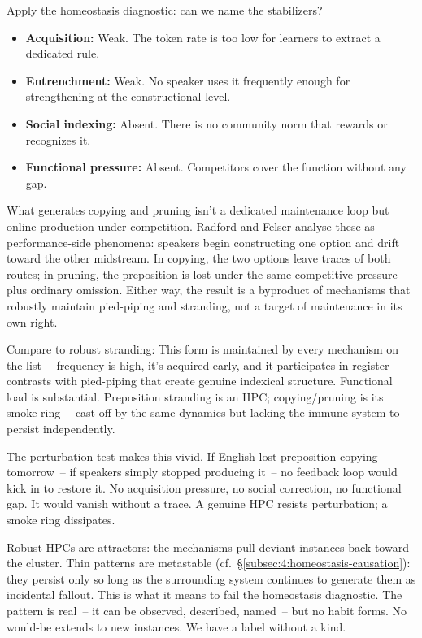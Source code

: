 Apply the homeostasis diagnostic: can we name the stabilizers?

\begin{itemize}
    \item \textbf{Acquisition:} Weak. The token rate is too low for learners to extract a dedicated rule.
    \item \textbf{Entrenchment:} Weak. No speaker uses it frequently enough for strengthening at the constructional level.
    \item \textbf{Social indexing:} Absent. There is no community norm that rewards or recognizes it.
    \item \textbf{Functional pressure:} Absent. Competitors cover the function without any gap.
\end{itemize}

What generates copying and pruning isn't a dedicated maintenance loop but online production under competition. Radford and Felser analyse these as performance-side phenomena: speakers begin constructing one option and drift toward the other midstream. In copying, the two options leave traces of both routes; in pruning, the preposition is lost under the same competitive pressure plus ordinary omission. Either way, the result is a byproduct of mechanisms that robustly maintain pied-piping and stranding, not a target of maintenance in its own right.

Compare to robust stranding:  This form is maintained by every mechanism on the list~-- frequency is high, it's acquired early, and it participates in register contrasts with pied-piping that create genuine indexical structure. Functional load is substantial. Preposition stranding is an HPC; copying/pruning is its smoke ring~-- cast off by the same dynamics but lacking the immune system to persist independently.

The perturbation test makes this vivid. If English lost preposition copying tomorrow~-- if speakers simply stopped producing it~-- no feedback loop would kick in to restore it. No acquisition pressure, no social correction, no functional gap. It would vanish without a trace. A genuine HPC resists perturbation; a smoke ring dissipates.

Robust HPCs are attractors: the mechanisms pull deviant instances back toward the cluster. Thin patterns are metastable (cf.\ §\ref{subsec:4:homeostasis-causation}): they persist only so long as the surrounding system continues to generate them as incidental fallout. This is what it means to fail the homeostasis diagnostic. The pattern is real~-- it can be observed, described, named~-- but no habit forms. No would-be extends to new instances. We have a label without a kind.

